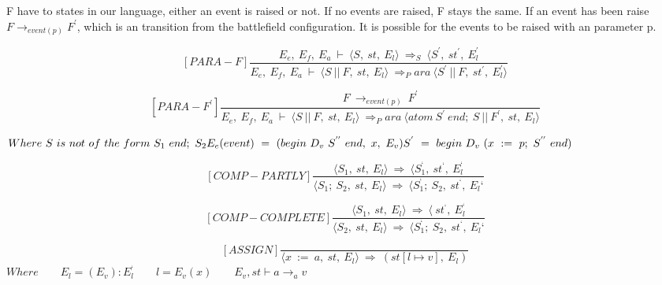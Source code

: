	
	
	
	
	F have to states in our language, either an event is raised or not. If no events are raised, F stays the same. If an event has been raise \begin{math} F \rightarrow_{event(p)} F^{'} \end{math}, which is an transition from the battlefield configuration. It is possible for the events to be raised with an parameter p. 
	
	
	
	
	
	\[	
	[PARA-F]	
	\dfrac{E_e, \ E_f, \ E_a \ \vdash \ \langle S, \ st, \ E_l \rangle \ \Rightarrow_S \ \langle S^{'}, \ st^{'}, \ E_l^{'}}{E_e, \ E_f, \ E_a \ \vdash \ \langle S \ || \ F, \ st, \ E_l \rangle \ \Rightarrow_Para \ \langle S^{'} \ || \ F, \ st^{'}, \ E_l^{'} \rangle}	
	\]
	
	
	
	
	
	\[	
	[PARA-F^{'}]	
	\dfrac{F \ \rightarrow_{event(p)} \ F^{'}}{E_e, \ E_f, \ E_a \ \vdash \ \langle S \ || \ F, \ st, \ E_l \rangle \ \Rightarrow_Para \ \langle atom \ S^{'} \ end; \ S \ || \ F^{'}, \ st, \ E_l \rangle}	
	\]
	
	
	
	
	
	\begin{math}		
		Where \ S \ is \ not \ of \ the \ form \ S_1 \ end; \ S_2 \newline		
		E_e(event) \ = \ (begin \ D_v \ S^{''} \ end, \ x, \ E_v) \newline		
		S^{'} \ = \ begin \ D_v \ (x \ := \ p; \ S^{''} \ end)		
	\end{math}
	
	
	
	
	
	\[
	[COMP-PARTLY]
	\dfrac{\langle S_1, \ st, \ E_l \rangle \ \Rightarrow \ \langle S_1^{‘}, \ st^{‘}, \ E_l^{‘}}{\langle S_1; \ S_2, \ st, \ E_l \rangle \ \Rightarrow \ \langle S_1^{‘}; \ S_2, \ st^{‘}, \ E_l{‘}}
	\]
	
	\[
	[COMP-COMPLETE]
	\dfrac{\langle S_1, \ st, \ E_l \rangle \ \Rightarrow \ \langle \ st^{‘}, \ E_l^{‘}}{\langle S_2, \ st, \ E_l \rangle \ \Rightarrow \ \langle S_1^{‘}; \ S_2, \ st^{‘}, \ E_l{‘}}
	\]
	
	
	\[
	[ASSIGN]
	\dfrac{}{\langle x \ := \ a, \ st, \ E_l \rangle \ \Rightarrow \ (st[l \mapsto v], \ E_l)}
	\]
	\begin{math}
		Where
		\qquad E_l = (E_v) : E_l^{‘}
		\qquad l = E_v(x)
		\qquad E_v, st \vdash a \rightarrow_a v
	\end{math}
	

